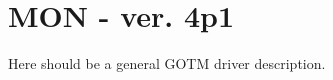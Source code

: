 \clearpage
\section{MON - ver. 4p1\label{sec:mom4p1}}

Here should be a general GOTM driver description.




